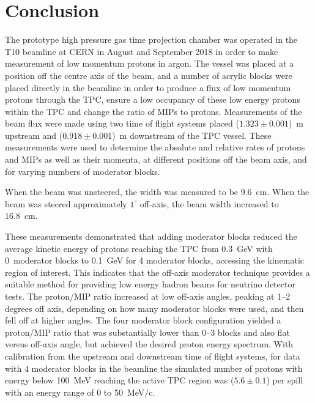 \section{Conclusion}
\label{hptpcPaper:sec:Conclusion}

The prototype high pressure gas time projection chamber was operated in the T10 beamline at CERN in August and September 2018 in order to make measurement of low momentum protons in argon.
The vessel was placed at a position off the centre axis of the beam, and a number of acrylic blocks were placed directly in the beamline in order to produce a flux of low momentum protons through the TPC, ensure a low occupancy of these low energy protons within the TPC and change the ratio of MIPs to protons.
Measurements of the beam flux were made using two time of flight systems placed ($1.323 \pm 0.001$)~m upstream and ($0.918 \pm 0.001$)~m downstream of the TPC vessel.
These measurements were used to determine the absolute and relative rates of protons and MIPs as well as their momenta, at different positions off the beam axis, and for varying numbers of moderator blocks.

When the beam was unsteered, the width was measured to be 9.6~cm.
When the beam was steered approximately $1^{\circ}$ off-axis, the beam width increased to 16.8~cm.

These measurements demonstrated that adding moderator blocks reduced the average kinetic energy of protons reaching the TPC from 0.3~GeV with 0~moderator blocks to 0.1~GeV for 4 moderator blocks, accessing the kinematic region of interest.
This indicates that the off-axis moderator technique provides a suitable method for providing low energy hadron beams for neutrino detector tests.
The proton/MIP ratio increased at low off-axis angles, peaking at 1–2 degrees off axis, depending on how many moderator blocks were used, and then fell off at higher angles.
The four moderator block configuration yielded a proton/MIP ratio that was  substantially lower than 0–3 blocks and also flat versus off-axis angle, but achieved the desired proton energy spectrum.
With calibration from the upstream and downstream time of flight systems, for data with 4 moderator blocks in the beamline the simulated number of protons with energy below 100~MeV reaching the active TPC region was ($5.6 \pm  0.1$) per spill with an energy range of 0 to 50~MeV/c.


